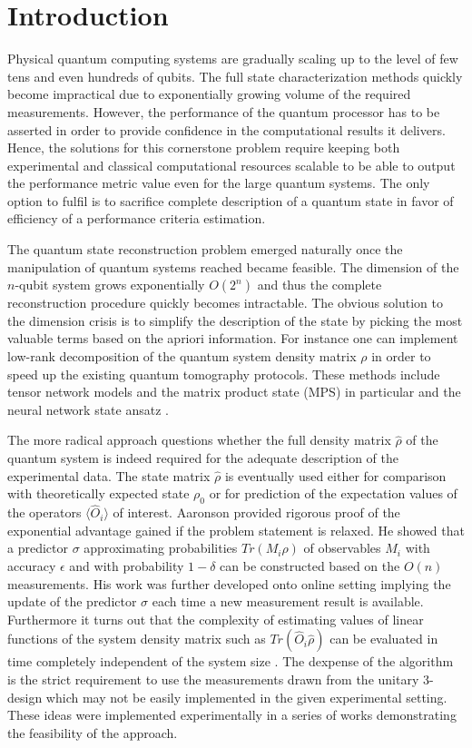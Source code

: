 \documentclass[%
 reprint,
 amsmath,amssymb,
 aps,
]{revtex4-2}
\begin{document}
\section{\label{sec:intro}Introduction}

Physical quantum computing systems are gradually scaling up to the level of few tens and even hundreds of qubits. The full state characterization methods quickly become impractical due to exponentially growing volume of the required measurements. However, the performance of the quantum processor has to be asserted in order to provide confidence in the computational results it delivers. Hence, the solutions for this cornerstone problem require keeping both experimental and classical computational resources scalable to be able to output the performance metric value even for the large quantum systems. The only option to fulfil is to sacrifice  complete description of a quantum state in favor of efficiency of a performance criteria estimation.

The quantum state reconstruction problem emerged naturally once the manipulation of quantum systems reached became feasible. The dimension of the $n$-qubit system grows exponentially $O(2^{n})$ and thus the complete reconstruction procedure quickly becomes intractable. The obvious solution to the dimension crisis is to simplify the description of the state by picking the most valuable terms based on the apriori information. For instance one can implement low-rank decomposition of the quantum system density matrix $\rho$ in order to speed up the existing quantum tomography protocols. These methods include tensor network models \cite{Orus2014} and the matrix product state (MPS) in particular \cite{MPS} and the neural network state ansatz \cite{Troyer2017}.

The more radical approach questions whether the full density matrix $\hat{\rho}$ of the quantum system is indeed required for the adequate description of the experimental data. The state matrix $\hat{\rho}$ is eventually used either for comparison with theoretically expected state $\rho_{0}$ or for prediction of the expectation values of the operators $\langle\hat{O}_{i}\rangle$ of interest. Aaronson \cite{Aaronson_2007} provided rigorous proof of the exponential advantage gained if the problem statement is relaxed. He showed that a predictor $\sigma$ approximating probabilities $Tr(M_{i}\rho)$ of observables $M_{i}$ with accuracy $\epsilon$ and with probability $1-\delta$ can be constructed based on the $O(n)$ measurements. His work was further developed onto online setting \cite{Aaronson_2019} implying the update of the predictor $\sigma$ each time a new measurement result is available. Furthermore it turns out that the complexity of estimating values of linear functions of the system density matrix such as $Tr(\hat{O}_{i}\hat{\rho})$ can be evaluated in time completely independent of the system size \cite{Kueng2020}. The dexpense of the algorithm is the strict requirement to use the measurements drawn from the unitary 3-design which may not be easily implemented in the given experimental setting. These ideas were implemented experimentally in a series of works \cite{Rocchetto2019, Struchalin2020} demonstrating the feasibility of the approach. 
\end{document}
